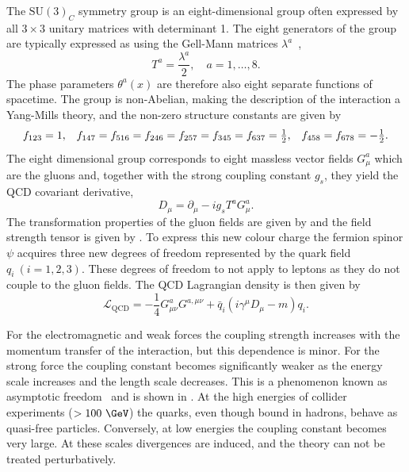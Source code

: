 The $\text{SU}(3)_C$ symmetry group is an eight-dimensional group often expressed by all $3 \times 3$ unitary matrices with determinant 1.
The eight generators of the group are typically expressed as using the Gell-Mann matrices $\lambda^a$~\cite{GellManMatrix},
\begin{equation}
    \label{eq:su3_generators}
    T^a = \frac{\lambda^a}{2}, \quad a = 1, \ldots, 8.
\end{equation}
The phase parameters $\theta^a(x)$ are therefore also eight separate functions of spacetime.
The group is non-Abelian, making the description of the interaction a Yang-Mills theory, and the non-zero structure constants are given by
\begin{equation}
    \label{eq:qcd_sc}
    \begin{array}{ccc}
        f_{123} = 1 ,                                                            & \hspace{\stretch{1}}
        f_{147} = f_{516} = f_{246} = f_{257} = f_{345} = f_{637} = \frac{1}{2}, & \hspace{\stretch{1}}
        f_{458} = f_{678} = -\frac{1}{2}.
    \end{array}
\end{equation}
The eight dimensional group corresponds to eight massless vector fields $G_\mu^a$ which are the gluons and, together with the strong coupling constant $g_s$, they yield the QCD covariant derivative,
\begin{equation}
    \label{eq:qcd_covariant_derivative}
    D_\mu = \partial_\mu - i g_s T^a G_\mu^a.
\end{equation}
The transformation properties of the gluon fields are given by  and the field strength tensor is given by .
To express this new colour charge the fermion spinor $\psi$ acquires three new degrees of freedom represented by the quark field $q_i\:(i = 1, 2, 3)$.
These degrees of freedom to not apply to leptons as they do not couple to the gluon fields.
The QCD Lagrangian density is then given by
\begin{equation}
    \label{eq:qcd_lagrangian}
    \mathcal{L}_\text{QCD} = -\frac{1}{4} G_{\mu\nu}^a G^{a,\mu\nu} + \bar q_i (i \gamma^\mu D_\mu - m) q_i.
\end{equation}

For the electromagnetic and weak forces the coupling strength increases with the momentum transfer of the interaction, but this dependence is minor.
For the strong force the coupling constant becomes significantly weaker as the energy scale increases and the length scale decreases.
This is a phenomenon known as asymptotic freedom~\cite{UltravioletBehaviorNonAbelian, ReliablePerturbativeResults, PriceAsymptoticFreedom} and is shown in .
At the high energies of collider experiments ($ > 100~\GeV$) the quarks, even though bound in hadrons, behave as quasi-free particles.
Conversely, at low energies the coupling constant becomes very large.
At these scales divergences are induced, and the theory can not be treated perturbatively.

